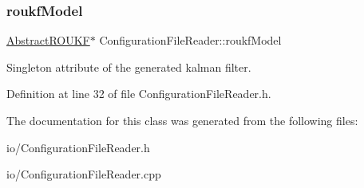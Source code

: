 \subsubsection{\texorpdfstring{roukf\+Model}{roukfModel}}
{\footnotesize\ttfamily \mbox{\hyperlink{classAbstractROUKF}{Abstract\+R\+O\+U\+KF}}$\ast$ Configuration\+File\+Reader\+::roukf\+Model\hspace{0.3cm}{\ttfamily [private]}}

Singleton attribute of the generated kalman filter. 

Definition at line 32 of file Configuration\+File\+Reader.\+h.



The documentation for this class was generated from the following files\+:\begin{DoxyCompactItemize}
\item 
io/Configuration\+File\+Reader.\+h\item 
io/Configuration\+File\+Reader.\+cpp\end{DoxyCompactItemize}

